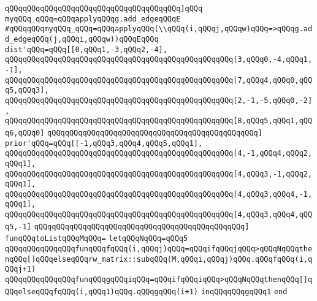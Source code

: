 \verb|qQQqqQQqqQQqqQQqqQQqqQQqqQQqqQQqqQQqqQQq]qQQq|\newline
\verb|myqQQq_qQQq=qQQqapplyqQQqg.add_edgeqQQqE|\newline
\verb|#qQQqqQQqmyqQQq_qQQq=qQQqapplyqQQq(\\qQQq(i,qQQqj,qQQqw)qQQq=>qQQqg.add_edgeqQQq(j,qQQqi,qQQqw))qQQqEqQQq|\newline
\newline
\verb|dist'qQQq=qQQq[[0,qQQq1,-3,qQQq2,-4],|\newline
\verb|qQQqqQQqqQQqqQQqqQQqqQQqqQQqqQQqqQQqqQQqqQQqqQQqqQQq[3,qQQq0,-4,qQQq1,-1],|\newline
\verb|qQQqqQQqqQQqqQQqqQQqqQQqqQQqqQQqqQQqqQQqqQQqqQQqqQQq[7,qQQq4,qQQq0,qQQq5,qQQq3],|\newline
\verb|qQQqqQQqqQQqqQQqqQQqqQQqqQQqqQQqqQQqqQQqqQQqqQQqqQQq[2,-1,-5,qQQq0,-2],|\newline
\verb|qQQqqQQqqQQqqQQqqQQqqQQqqQQqqQQqqQQqqQQqqQQqqQQqqQQq[8,qQQq5,qQQq1,qQQq6,qQQq0]|\newline
\verb|qQQqqQQqqQQqqQQqqQQqqQQqqQQqqQQqqQQqqQQqqQQqqQQq]|\newline
\verb|prior'qQQq=qQQq[[-1,qQQq3,qQQq4,qQQq5,qQQq1],|\newline
\verb|qQQqqQQqqQQqqQQqqQQqqQQqqQQqqQQqqQQqqQQqqQQqqQQqqQQq[4,-1,qQQq4,qQQq2,qQQq1],|\newline
\verb|qQQqqQQqqQQqqQQqqQQqqQQqqQQqqQQqqQQqqQQqqQQqqQQqqQQq[4,qQQq3,-1,qQQq2,qQQq1],|\newline
\verb|qQQqqQQqqQQqqQQqqQQqqQQqqQQqqQQqqQQqqQQqqQQqqQQqqQQq[4,qQQq3,qQQq4,-1,qQQq1],|\newline
\verb|qQQqqQQqqQQqqQQqqQQqqQQqqQQqqQQqqQQqqQQqqQQqqQQqqQQq[4,qQQq3,qQQq4,qQQq5,-1]|\newline
\verb|qQQqqQQqqQQqqQQqqQQqqQQqqQQqqQQqqQQqqQQqqQQqqQQq]|\newline
\newline
\verb|funqQQqtoListqQQqMqQQq=|\newline
\verb|letqQQqNqQQq=qQQq5|\newline
\verb|qQQqqQQqqQQqqQQqfunqQQqfqQQq(i,qQQqj)qQQq=qQQqifqQQqjqQQq>qQQqNqQQqthenqQQq[]qQQqelseqQQqrw_matrix::subqQQq(M,qQQqi,qQQqj)qQQq.qQQqfqQQq(i,qQQqj+1)|\newline
\verb|qQQqqQQqqQQqqQQqfunqQQqgqQQqiqQQq=qQQqifqQQqiqQQq>qQQqNqQQqthenqQQq[]qQQqelseqQQqfqQQq(i,qQQq1)qQQq.qQQqgqQQq(i+1)|\newline
\verb|inqQQqqQQqgqQQq1|\newline
\verb|end|\newline
